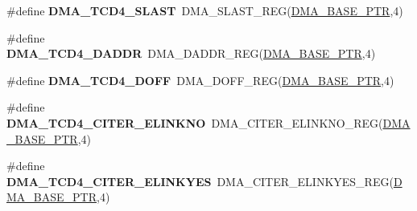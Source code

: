 \begin{DoxyCompactItemize}
\item 
\hypertarget{group___d_m_a___register___accessor___macros_gac9552b10b44987816c32f2122c2f6dc7}{}\#define {\bfseries D\+M\+A\+\_\+\+T\+C\+D4\+\_\+\+S\+L\+A\+S\+T}~D\+M\+A\+\_\+\+S\+L\+A\+S\+T\+\_\+\+R\+E\+G(\hyperlink{group___d_m_a___peripheral_ga6997fbc1b1973e9f27170217a3bd6f22}{D\+M\+A\+\_\+\+B\+A\+S\+E\+\_\+\+P\+T\+R},4)\label{group___d_m_a___register___accessor___macros_gac9552b10b44987816c32f2122c2f6dc7}

\item 
\hypertarget{group___d_m_a___register___accessor___macros_gad344471a51f038a6669dbb0d31f8406c}{}\#define {\bfseries D\+M\+A\+\_\+\+T\+C\+D4\+\_\+\+D\+A\+D\+D\+R}~D\+M\+A\+\_\+\+D\+A\+D\+D\+R\+\_\+\+R\+E\+G(\hyperlink{group___d_m_a___peripheral_ga6997fbc1b1973e9f27170217a3bd6f22}{D\+M\+A\+\_\+\+B\+A\+S\+E\+\_\+\+P\+T\+R},4)\label{group___d_m_a___register___accessor___macros_gad344471a51f038a6669dbb0d31f8406c}

\item 
\hypertarget{group___d_m_a___register___accessor___macros_gace552f45c71998efe2fe0ae26939f548}{}\#define {\bfseries D\+M\+A\+\_\+\+T\+C\+D4\+\_\+\+D\+O\+F\+F}~D\+M\+A\+\_\+\+D\+O\+F\+F\+\_\+\+R\+E\+G(\hyperlink{group___d_m_a___peripheral_ga6997fbc1b1973e9f27170217a3bd6f22}{D\+M\+A\+\_\+\+B\+A\+S\+E\+\_\+\+P\+T\+R},4)\label{group___d_m_a___register___accessor___macros_gace552f45c71998efe2fe0ae26939f548}

\item 
\hypertarget{group___d_m_a___register___accessor___macros_ga11418abcfba691b0c95b6996829e4398}{}\#define {\bfseries D\+M\+A\+\_\+\+T\+C\+D4\+\_\+\+C\+I\+T\+E\+R\+\_\+\+E\+L\+I\+N\+K\+N\+O}~D\+M\+A\+\_\+\+C\+I\+T\+E\+R\+\_\+\+E\+L\+I\+N\+K\+N\+O\+\_\+\+R\+E\+G(\hyperlink{group___d_m_a___peripheral_ga6997fbc1b1973e9f27170217a3bd6f22}{D\+M\+A\+\_\+\+B\+A\+S\+E\+\_\+\+P\+T\+R},4)\label{group___d_m_a___register___accessor___macros_ga11418abcfba691b0c95b6996829e4398}

\item 
\hypertarget{group___d_m_a___register___accessor___macros_ga5f9ae40aad0685169fe662966b2093e7}{}\#define {\bfseries D\+M\+A\+\_\+\+T\+C\+D4\+\_\+\+C\+I\+T\+E\+R\+\_\+\+E\+L\+I\+N\+K\+Y\+E\+S}~D\+M\+A\+\_\+\+C\+I\+T\+E\+R\+\_\+\+E\+L\+I\+N\+K\+Y\+E\+S\+\_\+\+R\+E\+G(\hyperlink{group___d_m_a___peripheral_ga6997fbc1b1973e9f27170217a3bd6f22}{D\+M\+A\+\_\+\+B\+A\+S\+E\+\_\+\+P\+T\+R},4)\label{group___d_m_a___register___accessor___macros_ga5f9ae40aad0685169fe662966b2093e7}


\end{DoxyCompactItemize}
